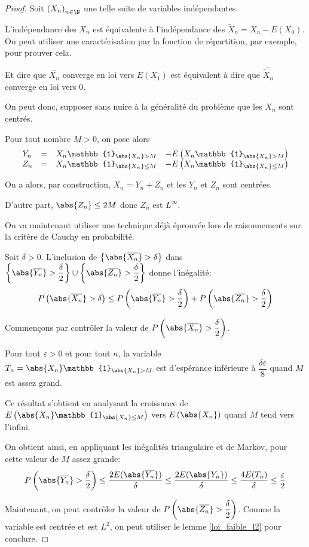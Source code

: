 \begin{proof}
Soit $\left(X_n\right)_{n \in \N}$ une telle suite de variables indépendantes.

L'indépendance des $X_n$ est équivalente à l'indépendance des $\widetilde{X}_n = X_n-E(X_0)$. On peut utiliser une caractérisation par la fonction de répartition, par exemple, pour prouver cela.

Et dire que $\overline{X_n}$ converge en loi vers $E(X_1)$ est équivalent à dire que $\overline{\widetilde{X}_n}$ converge en loi vers $0$.


On peut donc, supposer sans nuire à la généralité du problème que les $X_n$ sont centrés.

Pour tout nombre $M>0$, on pose alors
\[
\begin{array}{lcll}
Y_n & = & X_n \mathbb{1}_{\abs{X_n} > M}  & - E\left(X_n\mathbb{1}_{\abs{X_n} > M}\right) \\
Z_n & = & X_n \mathbb{1}_{\abs{X_n} \leq M}  & - E\left(X_n\mathbb{1}_{\abs{X_n} \leq M}\right)
\end{array}
\]

On a alors, par construction, $X_n = Y_n + Z_n$ et les $Y_n$ et $Z_n$ sont centrées.

D'autre part, $\abs{Z_n} \leq 2M$ donc $Z_n$ est $L^\infty$.

On va maintenant utiliser une technique déjà éprouvée lors de raisonnements sur la critère de Cauchy en probabilité. 

Soit $\delta>0$. L'inclusion de $\left\{ \abs{\overline{X_n}}>\delta \right \}$ dans $\left\{ \abs{\overline{Y_n}}>\dfrac{\delta}{2} \right \} \cup \left\{ \abs{\overline{Z_n}}>\dfrac{\delta}{2} \right \}$ donne l'inégalité:
\[
P\left(\abs{\overline{X_n}}>\delta \right) \leq P\left(\abs{\overline{Y_n}}>\dfrac{\delta}{2} \right)+P\left(\abs{\overline{Z_n}}>\dfrac{\delta}{2}\right)
\]

Commençons par contrôler la valeur de $P\left(\abs{\overline{X_n}}>\dfrac{\delta}{2} \right)$.

Pour tout $\varepsilon>0$ et pour tout $n$, la variable $T_n=\abs{X_n} \mathbb{1}_{\abs{X_n} > M}$ est d'espérance inférieure à $\dfrac{\delta \varepsilon}{8}$ quand $M$ est assez grand. 

Ce résultat s'obtient en analysant la croissance de $E\left(\abs{X_n} \mathbb{1}_{\abs{X_n} \leq M}\right)$ vers $E\left(\abs{X_n}\right)$ quand $M$ tend vers l'infini.

On obtient ainsi, en appliquant les inégalités triangulaire et de Markov, pour cette valeur de $M$ assez grande:
\[
P\left(\abs{\overline{Y_n}}>\dfrac{\delta}{2} \right) \leq \dfrac{2E(\abs{\overline{Y_n}})}{\delta} \leq \dfrac{2E(\abs{Y_n})}{\delta} \leq \dfrac{4E(T_n)}{\delta} \leq \dfrac{\varepsilon}{2}
\]

Maintenant, on peut contrôler la valeur de $P\left(\abs{\overline{Z_n}}>\dfrac{\delta}{2}\right)$. Comme la variable est centrée et est $L^2$, on peut utiliser le lemme \ref{loi_faible_l2} pour conclure.
\end{proof}

